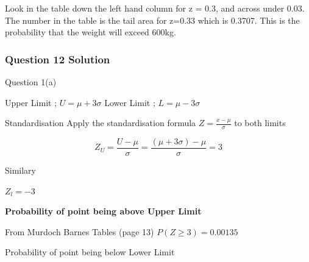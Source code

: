 ﻿\documentclass[]{report}
\begin{document}
Look in the table down the left hand column for z = 0.3, and across under 0.03.
The number in the table is the tail area for z=0.33 which is 0.3707.
This is the probability that the weight will exceed 600kg.
%
%








\subsubsection{Question 12 Solution}

Question 1(a)

Upper Limit ;  $U = \mu + 3 \sigma $
Lower Limit ;  $L = \mu - 3 \sigma $

Standardisation
Apply the standardisation formula	$Z=\frac{x-\mu}{\sigma} $	to both limits

\[ Z_U = \frac{U-\mu}{\sigma} =  \frac{(\mu + 3 \sigma)-\mu}{\sigma} = 3\]

Similary

$Z_l=-3$ 

\noindent \textbf{Probability of point being above Upper Limit}

From Murdoch Barnes Tables (page 13)  $P(Z \geq 3)=0.00135$

Probability of point being below Lower Limit
\end{document}
